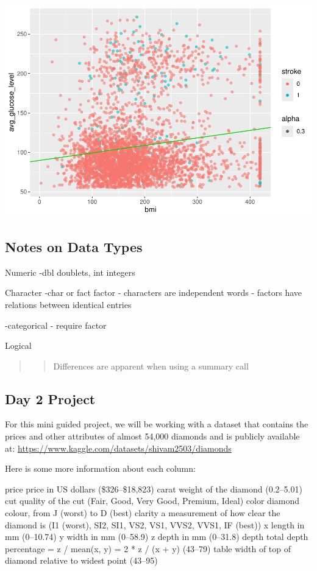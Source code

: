 \documentclass[
]{book}
\begin{document}
\includegraphics{_main_files/figure-latex/unnamed-chunk-105-1.pdf}

\subsection{Notes on Data Types}\label{notes-on-data-types}

Numeric
-dbl doublets, int integers

Character
-char or fact factor
- characters are independent words
- factors have relations between identical entries

-categorical
- require factor

Logical

\begin{quote}
\begin{quote}
Differences are apparent when using a summary call
\end{quote}
\end{quote}

\subsection{Day 2 Project}\label{day-2-project}

For this mini guided project, we will be working with a dataset that contains the prices and other attributes of almost 54,000 diamonds and is publicly available at: \url{https://www.kaggle.com/datasets/shivam2503/diamonds}

Here is some more information about each column:

price price in US dollars (\$326--\$18,823)
carat weight of the diamond (0.2--5.01)
cut quality of the cut (Fair, Good, Very Good, Premium, Ideal)
color diamond colour, from J (worst) to D (best)
clarity a measurement of how clear the diamond is (I1 (worst), SI2, SI1, VS2, VS1, VVS2, VVS1, IF (best))
x length in mm (0--10.74)
y width in mm (0--58.9)
z depth in mm (0--31.8)
depth total depth percentage = z / mean(x, y) = 2 * z / (x + y) (43--79)
table width of top of diamond relative to widest point (43--95)
\end{document}
